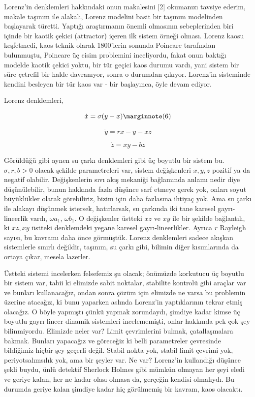 \documentclass[12pt,fleqn]{article}\usepackage{../../common}
\begin{document}
Lorenz'in denklemleri hakkındaki onun makalesini [2] okumanızı tavsiye
ederim, makale taşınım ile alakalı, Lorenz modelini basit bir taşınım
modelinden başlayarak türetti. Yaptığı araştırmanın önemli olmasının
sebeplerinden biri içinde bir kaotik çekici (attractor) içeren ilk sistem
örneği olması. Lorenz kaosu keşfetmedi, kaos teknik olarak 1800'lerin
sonunda Poincare tarafından bulunmuştu, Poincare üç cisim problemini
inceliyordu, fakat onun baktığı modelde kaotik çekici yoktu, bir tür geçici
kaos durumu vardı, yani sistem bir süre çetrefil bir halde davranıyor,
sonra o durumdan çıkıyor. Lorenz'in sisteminde kendini besleyen bir tür
kaos var - bir başlayınca, öyle devam ediyor.

Lorenz denklemleri,

$$ 
\dot{x} = \sigma (y - x) 
\mlabel{6} 
$$

$$ \dot{y} = rx - y - xz $$

$$ \dot{z} = xy - bz $$

Görüldüğü gibi aynen su çarkı denklemleri gibi üç boyutlu bir sistem
bu. $\sigma,r,b > 0$ olacak şekilde parametreleri var, sistem değişkenleri
$x,y,z$ pozitif ya da negatif olabilir. Değişkenlerin sıvı akış mekaniği
bağlamında anlamı nedir diye düşünülebilir, bunun hakkında fazla düşünce
sarf etmeye gerek yok, onları soyut büyüklükler olarak görebiliriz, bizim
için daha fazlasına ihtiyaç yok. Ama su çarkı ile alakayı düşünmek
istersek, hatırlarsak, su çarkında iki tane karesel gayrı-lineerlik vardı,
$\omega a_1$, $\omega b_1$. O değişkenler üstteki $xz$ ve $xy$ ile bir
şekilde bağlantılı, ki $xz,xy$ üstteki denklemdeki yegane karesel
gayrı-lineerlikler. Ayrıca $r$ Rayleigh sayısı, bu kavramı daha önce
görmüştük. Lorenz denklemleri sadece akışkan sistemlerle sınırlı değildir,
taşınım, su çarkı gibi, bilimin diğer kısımlarında da ortaya çıkar, mesela
lazerler.

Üstteki sistemi incelerken felsefemiz şu olacak; önümüzde korkutucu üç
boyutlu bir sistem var, tabii ki elimizde sabit noktalar, stabilite
kontrolü gibi araçlar var ve bunları kullanacağız, ondan sonra çözüm için
elimizde ne varsa bu problemin üzerine atacağız, ki bunu yaparken aslında
Lorenz'in yaptıklarının tekrar etmiş olacağız. O böyle yapmıştı çünkü
yapmak zorundaydı, şimdiye kadar kimse üç boyutlu gayrı-lineer dinamik
sistemleri incelememişti, onlar hakkında pek çok şey bilinmiyordu. Elimizde
neler var? Limit çevrimlerini bulmak, çatallaşmalara bakmak. Bunları
yapacağız ve göreceğiz ki belli parametreler çevresinde bildiğimiz hiçbir
şey geçerli değil. Stabil nokta yok, stabil limit çevrimi yok,
periyotsalımsılık yok, ama bir şeyler var. Ne var? Lorenz'in kullandığı
düşünce şekli buydu, ünlü detektif Sherlock Holmes gibi mümkün olmayan her
şeyi eledi ve geriye kalan, her ne kadar olası olmasa da, gerçeğin kendisi
olmalıydı. Bu durumda geriye kalan şimdiye kadar hiç görülmemiş bir kavram,
kaos olacaktı.
\end{document}

